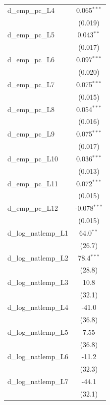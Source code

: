 \begin{tabular}{lc}
   d\_emp\_pc\_L4          & 0.065$^{***}$\\   
                           & (0.019)\\   
   d\_emp\_pc\_L5          & 0.043$^{**}$\\   
                           & (0.017)\\   
   d\_emp\_pc\_L6          & 0.097$^{***}$\\   
                           & (0.020)\\   
   d\_emp\_pc\_L7          & 0.075$^{***}$\\   
                           & (0.015)\\   
   d\_emp\_pc\_L8          & 0.054$^{***}$\\   
                           & (0.016)\\   
   d\_emp\_pc\_L9          & 0.075$^{***}$\\   
                           & (0.017)\\   
   d\_emp\_pc\_L10         & 0.036$^{***}$\\   
                           & (0.013)\\   
   d\_emp\_pc\_L11         & 0.072$^{***}$\\   
                           & (0.015)\\   
   d\_emp\_pc\_L12         & -0.078$^{***}$\\   
                           & (0.015)\\   
   d\_log\_natlemp\_L1     & 64.0$^{**}$\\   
                           & (26.7)\\   
   d\_log\_natlemp\_L2     & 78.4$^{***}$\\   
                           & (28.8)\\   
   d\_log\_natlemp\_L3     & 10.8\\   
                           & (32.1)\\   
   d\_log\_natlemp\_L4     & -41.0\\   
                           & (36.8)\\   
   d\_log\_natlemp\_L5     & 7.55\\   
                           & (36.8)\\   
   d\_log\_natlemp\_L6     & -11.2\\   
                           & (32.3)\\   
   d\_log\_natlemp\_L7     & -44.1\\   
                           & (32.1)\\   

\end{tabular}
